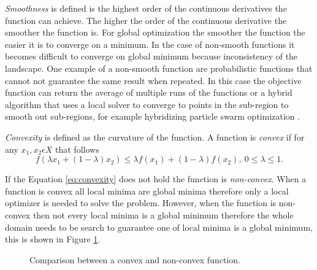 \textit{Smoothness} is defined is the highest order of the continuous derivatives the function can achieve. The higher the order of the continuous derivative the smoother the function is. For global optimization the smoother the function the easier it is to converge on a minimum. In the case of non-smooth functions it becomes difficult to converge on global minimum because inconsistency of the landscape. One example of a non-smooth function are probabilistic functions that cannot not
guarantee the same result when repeated. In this case the objective function can return the average of multiple runs of the functions or a hybrid algorithm that uses a local solver to converge to points in the sub-region to smooth out sub-regions, for example hybridizing particle swarm optimization \cite{Kaveh2014}.

\textit{Convexity} is defined as the curvature of the function. A function is \textit{convex} if for any $x_1,x_2 \epsilon X$ that follows
\begin{equation}
    \label{eq:convexity}
    f(\lambda x_1 + (1-\lambda)x_2) \leq \lambda f(x_1)+(1-\lambda)f(x_2),\ 0 \leq \lambda \leq 1.
\end{equation}

If the Equation \ref{eq:convexity} does not hold the function is \textit{non-convex}. When a function is convex all local minima are global minima therefore only a local optimizer is needed to solve the problem. However, when the function is non-convex then not every local minima is a global minimum therefore the whole domain needs to be search to guarantee one of local minima is a global minimum, this is shown in Figure \ref{fig:convexity}.  

\begin{figure}[!h]
  
  \begin{subfigure}[t]{0.5\textwidth}
      \caption{}
    \end{subfigure}
    \begin{subfigure}[t]{0.5\textwidth}
      \caption{}
    \end{subfigure}
  \caption{Comparison between a convex and non-convex function.}
  \label{fig:convexity}
\end{figure}

